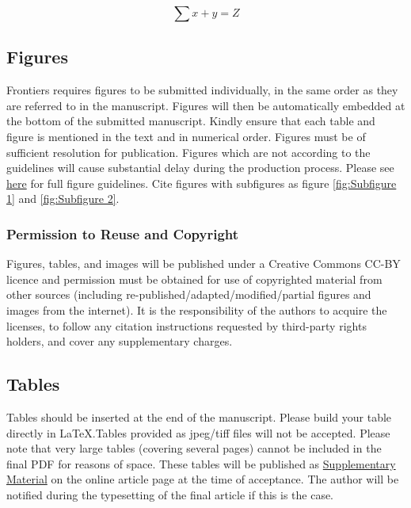 \documentclass[utf8]{FrontiersinVancouver} %
\begin{document}
\begin{equation}
\sum x+ y =Z\label{eq:01}
\end{equation}

\subsection{Figures}

Frontiers requires figures to be submitted individually, in the same
order as they are referred to in the manuscript. Figures will then be
automatically embedded at the bottom of the submitted
manuscript. Kindly ensure that each table and figure is mentioned in
the text and in numerical order. Figures must be of sufficient
resolution for publication. Figures which are not according to the
guidelines will cause substantial delay during the production
process. Please see
\href{https://www.frontiersin.org/guidelines/author-guidelines#figure-and-table-guidelines}{here}
for full figure guidelines. Cite figures with subfigures as figure
\ref{fig:Subfigure 1} and \ref{fig:Subfigure 2}.


\subsubsection{Permission to Reuse and Copyright}

Figures, tables, and images will be published under a Creative Commons
CC-BY licence and permission must be obtained for use of copyrighted
material from other sources (including
re-published/adapted/modified/partial figures and images from the
internet). It is the responsibility of the authors to acquire the
licenses, to follow any citation instructions requested by third-party
rights holders, and cover any supplementary charges.


\subsection{Tables}

Tables should be inserted at the end of the manuscript. Please build
your table directly in LaTeX.Tables provided as jpeg/tiff files will
not be accepted. Please note that very large tables (covering several
pages) cannot be included in the final PDF for reasons of space. These
tables will be published as
\href{https://www.frontiersin.org/guidelines/author-guidelines#supplementary-material}{Supplementary
  Material} on the online article page at the time of acceptance. The
author will be notified during the typesetting of the final article if
this is the case.
\end{document}
